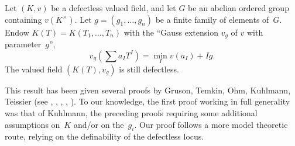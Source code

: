 \documentclass[JEP,XML,SOM,Unicode,ThmDefs,NoEqCountersInSection,published]{cedram}
\theoremstyle{plain}
\theoremstyle{definition}
\begin{document}
\begin{theo}\label{theo-abhyankar-defectless}
Let $(K,v)$ be a defectless valued field, and let $G$ be an abelian ordered group containing
$v(K^\times)$.
Let $g=(g_1,\ldots, g_n)$ be a finite family of elements of~$G$. Endow
$K(T)=K(T_1,\ldots,T_n)$
with the ``Gauss extension $v_g$ of $v$ with parameter~$g$'',
\ie
\[v_g(\sum a_I T ^I)=\min_I v(a_I)+Ig.\]
The valued field $(K(T), v_g)$ is still defectless.
\end{theo}

\medskip
This result has been given several proofs by Gruson, Temkin, Ohm, Kuhlmann, Teissier (see \cite{gruson}, \cite{temkin2010}, \cite{ohm1989}, \cite{kuhl}, \cite{teissier}). To our knowledge, the
first proof working in full generality was that of Kuhlmann, the preceding proofs requiring some additional assumptions on~$K$ and/or on the~$g_i$.
Our proof follows a more model theoretic route, relying on the definability of the
defectless locus.
\end{document}
